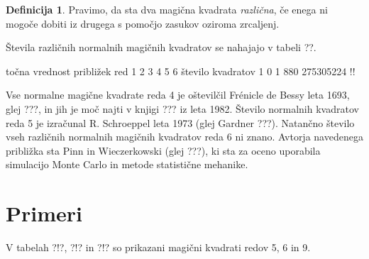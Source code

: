 \documentclass[a4paper,12pt]{article}
\theoremstyle{definition}
\newtheorem{definicija}{Definicija}
\theoremstyle{plain}
\begin{document}
 \begin{definicija}
      Pravimo, da sta dva magična kvadrata \emph{različna}, če enega ni mogoče dobiti
      iz drugega s pomočjo zasukov oziroma zrcaljenj.
 \end{definicija}

Števila različnih normalnih magičnih kvadratov se nahajajo v tabeli ??.

      točna vrednost približek
      red 1 2 3 4 5 6
      število kvadratov 1 0 1 880 275305224 !!

Vse normalne magične kvadrate reda 4 je oštevilčil Frénicle de Bessy
leta 1693, glej ???, in jih je moč najti v knjigi ???
iz leta 1982. Število normalnih kvadratov reda 5 je izračunal
R. Schroeppel leta 1973 (glej Gardner ???).
Natančno število vseh različnih normalnih magičnih kvadratov reda 6 ni znano.
Avtorja navedenega približka sta Pinn in Wieczerkowski (glej ???), ki
sta za oceno uporabila simulacijo Monte Carlo in metode statistične mehanike.


\section{Primeri}

V tabelah ?!?, ?!? in ?!? so prikazani
magični kvadrati redov 5, 6 in 9.


\end{document}
